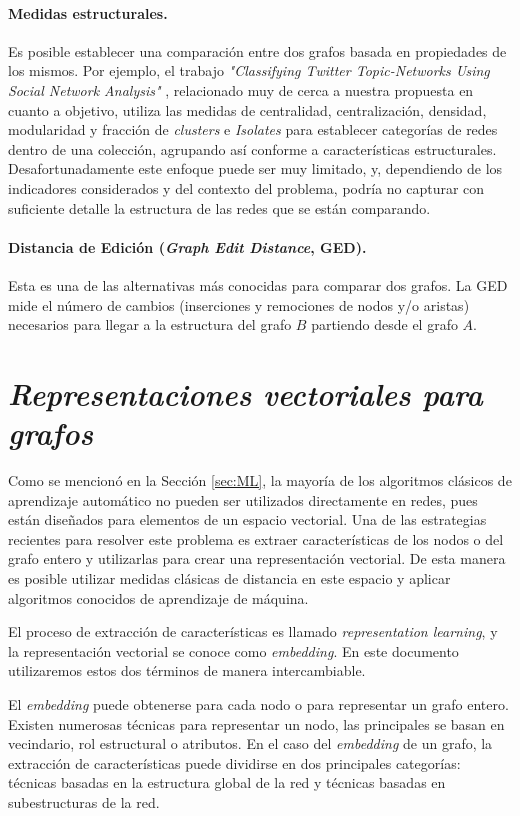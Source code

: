 \paragraph{Medidas estructurales.} Es posible establecer una comparación entre dos grafos basada en propiedades de los mismos. Por ejemplo, el trabajo \textit{"Classifying Twitter Topic-Networks Using Social Network Analysis"} \cite{himelboim_classifying_2017}, relacionado muy de cerca a nuestra propuesta en cuanto a objetivo, utiliza las medidas de centralidad, centralización, densidad, modularidad y fracción de \textit{clusters} e \textit{Isolates} para establecer categorías de redes dentro de una colección, agrupando así conforme a características estructurales. Desafortunadamente este enfoque puede ser muy limitado, y, dependiendo de los indicadores considerados y del contexto del problema, podría no capturar con suficiente detalle la estructura de las redes que se están comparando. 

\paragraph{Distancia de Edición (\textit{Graph Edit Distance}, GED).} Esta es una de las alternativas más conocidas para comparar dos grafos. La GED mide el número de cambios (inserciones y remociones de nodos y/o aristas) necesarios para llegar a la estructura del grafo $B$ partiendo desde el grafo $A$. 

\section{\textit{Representaciones vectoriales para grafos}}
Como se mencionó en la Sección \ref{sec:ML}, la mayoría de los algoritmos clásicos de aprendizaje automático no pueden ser utilizados directamente en redes, pues están diseñados para elementos de un espacio vectorial. Una de las estrategias recientes para resolver este problema es extraer características de los nodos o del grafo entero y utilizarlas para crear una representación vectorial. De esta manera es posible utilizar medidas clásicas de distancia en este espacio y aplicar algoritmos conocidos de aprendizaje de máquina. 

El proceso de extracción de características es llamado {\it representation learning}, y la representación vectorial se conoce como \textit{embedding}. En este documento utilizaremos estos dos términos de manera intercambiable.

El \textit{embedding} puede obtenerse para cada nodo o para representar un grafo entero. Existen numerosas técnicas para representar un nodo, las principales se basan en vecindario, rol estructural o atributos. En el caso del \textit{embedding} de un grafo, la extracción de características puede dividirse en dos principales categorías: técnicas basadas en la estructura global de la red y técnicas basadas en subestructuras de la red.

